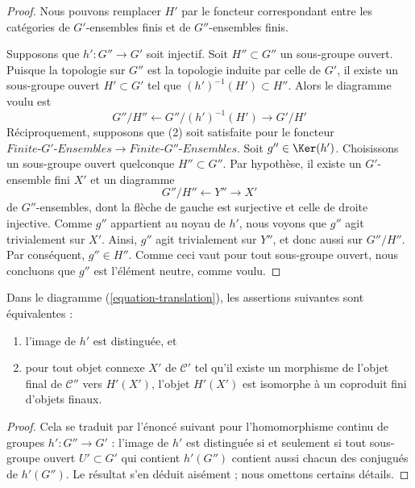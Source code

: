 \begin{proof}
Nous pouvons remplacer $H'$ par le foncteur correspondant entre les catégories
de $G'$-ensembles finis et de $G''$-ensembles finis.

\medskip\noindent
Supposons que $h' : G'' \to G'$ soit injectif. Soit $H'' \subset G''$
un sous-groupe ouvert. Puisque la topologie sur $G''$ est la topologie induite
par celle de $G'$, il existe un sous-groupe ouvert $H' \subset G'$
tel que $(h')^{-1}(H') \subset H''$.
Alors le diagramme voulu est
$$
G''/H'' \leftarrow G''/(h')^{-1}(H') \rightarrow G'/H'
$$
Réciproquement, supposons que (2) soit satisfaite pour le foncteur
$\textit{Finite-}G'\textit{-Ensembles} \to \textit{Finite-}G''\textit{-Ensembles}$.
Soit $g'' \in \Ker(h')$. Choisissons un sous-groupe ouvert quelconque $H'' \subset G''$.
Par hypothèse, il existe un $G'$-ensemble fini $X'$ et un diagramme
$$
G''/H'' \leftarrow Y'' \rightarrow X'
$$
de $G''$-ensembles, dont la flèche de gauche est surjective et celle de droite injective.
Comme $g''$ appartient au noyau de $h'$, nous voyons que $g''$ agit trivialement sur $X'$.
Ainsi, $g''$ agit trivialement sur $Y''$, et donc aussi sur $G''/H''$.
Par conséquent, $g'' \in H''$. Comme ceci vaut pour tout sous-groupe ouvert, nous concluons
que $g''$ est l'élément neutre, comme voulu.
\end{proof}

\begin{lemma}
\label{lemma-functoriality-galois-normal}
Dans le diagramme (\ref{equation-translation}), les assertions suivantes sont équivalentes :
\begin{enumerate}
\item l'image de $h'$ est distinguée, et
\item pour tout objet connexe $X'$ de $\mathcal{C}'$ tel
qu'il existe un morphisme de l'objet final de $\mathcal{C}''$
vers $H'(X')$, l'objet $H'(X')$ est isomorphe à un coproduit fini
d'objets finaux.
\end{enumerate}
\end{lemma}

\begin{proof}
Cela se traduit par l'énoncé suivant pour l'homomorphisme continu
de groupes $h' : G'' \to G'$ : l'image de $h'$ est distinguée
si et seulement si tout sous-groupe ouvert $U' \subset G'$ qui
contient $h'(G'')$ contient aussi chacun des conjugués de $h'(G'')$.
Le résultat s'en déduit aisément ; nous omettons certains détails.
\end{proof}






